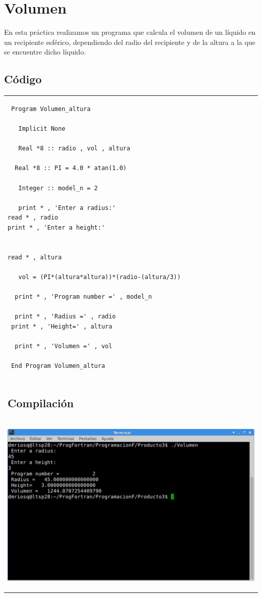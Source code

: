 \documentclass[10pt]{article}
\begin{document}
\section{Volumen}
En esta práctica realizamos un programa que calcula el volumen de un líquido en un recipiente esférico, dependiendo del radio del recipiente y de la altura a la que se encuentre dicho líquido.


\subsection{Código}
\begin{tabular}{l}
\begin{verbatim}  
 Program Volumen_altura 

   Implicit None 

   Real *8 :: radio , vol , altura 

  Real *8 :: PI = 4.0 * atan(1.0) 

   Integer :: model_n = 2 

   print * , 'Enter a radius:'
read * , radio 
print * , 'Enter a height:'

    
read * , altura

   vol = (PI*(altura*altura))*(radio-(altura/3))

  print * , 'Program number =' , model_n 

  print * , 'Radius =' , radio 
 print * , 'Height=' , altura
   
  print * , 'Volumen =' , vol 

 End Program Volumen_altura
\end{verbatim} \\
\subsection{Compilación}\\

\begin{center}
   \includegraphics[scale=0.4]{V}
\end{center}
\end{tabular}
\end{document}
